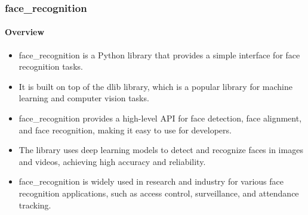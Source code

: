 \documentclass[aspectratio=169]{beamer}
\begin{document}
\begin{frame}
	\centering
	\frametitle{face\_recognition}
	\framesubtitle{Overview}
	\begin{minipage}{0.95\textwidth}
		\begin{itemize}
			\item face\_recognition is a Python library that provides a simple interface for face recognition tasks.
			\item It is built on top of the dlib library, which is a popular library for machine learning and computer vision tasks.
			\item face\_recognition provides a high-level API for face detection, face alignment, and face recognition, making it easy to use for developers.
			\item The library uses deep learning models to detect and recognize faces in images and videos, achieving high accuracy and reliability.
			\item face\_recognition is widely used in research and industry for various face recognition applications, such as access control, surveillance, and attendance tracking.
		\end{itemize}
	\end{minipage}
\end{frame}
\end{document}
